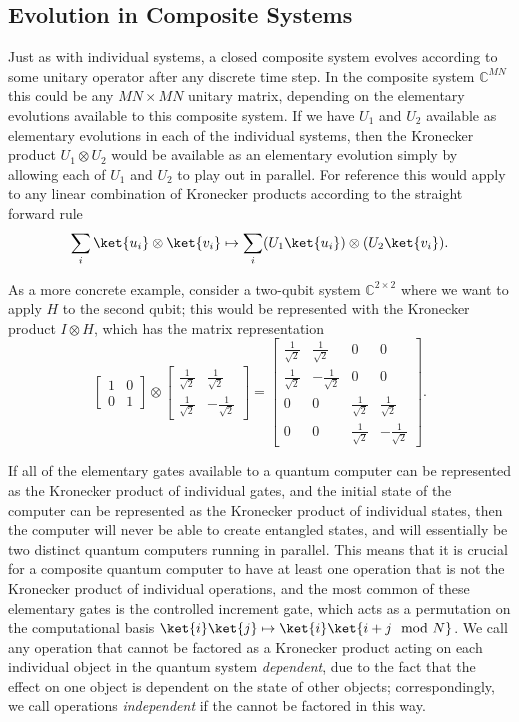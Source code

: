 \subsection{Evolution in Composite Systems}\label{composite-evolution}
Just as with individual systems, a closed composite system evolves according to some unitary operator after any discrete time step. In the composite system $\mathbb{C}^{MN}$ this could be any $MN \times MN$ unitary matrix, depending on the elementary evolutions available to this composite system. If we have $U_1$ and $U_2$ available as elementary evolutions in each of the individual systems, then the Kronecker product $U_1 \otimes U_2$ would be available as an elementary evolution simply by allowing each of $U_1$ and $U_2$ to play out in parallel. For reference this would apply to any linear combination of Kronecker products according to the straight forward rule
\[\sum_i \ket{u_i}\otimes\ket{v_i} \mapsto \sum_i (U_1\ket{u_i})\otimes (U_2\ket{v_i}).\]

As a more concrete example, consider a two-qubit system $\mathbb{C}^{2\times 2}$ where we want to apply $H$ to the second qubit; this would be represented with the Kronecker product $I \otimes H$, which has the matrix representation
\[
\left[\begin{matrix}
	1&0\\
	0&1
\end{matrix}\right]
\otimes
\left[\begin{matrix}
	\frac{1}{\sqrt{2}}&\frac{1}{\sqrt{2}}\\
	\frac{1}{\sqrt{2}}&-\frac{1}{\sqrt{2}}
\end{matrix}\right]
=
\left[\begin{matrix}
	\frac{1}{\sqrt{2}}&\frac{1}{\sqrt{2}}&0&0\\
	\frac{1}{\sqrt{2}}&-\frac{1}{\sqrt{2}}&0&0\\
	0&0&\frac{1}{\sqrt{2}}&\frac{1}{\sqrt{2}}\\
	0&0&\frac{1}{\sqrt{2}}&-\frac{1}{\sqrt{2}}
\end{matrix}\right].
\]

If all of the elementary gates available to a quantum computer can be represented as the Kronecker product of individual gates, and the initial state of the computer can be represented as the Kronecker product of individual states, then the computer will never be able to create entangled states, and will essentially be two distinct quantum computers running in parallel. This means that it is crucial for a composite quantum computer to have at least one operation that is not the Kronecker product of individual operations, and the most common of these elementary gates is the controlled increment gate, which acts as a permutation on the computational basis $\ket{i}\ket{j} \mapsto \ket{i}\ket{i+j \mod N}$. We call any operation that cannot be factored as a Kronecker product acting on each individual object in the quantum system \emph{dependent}, due to the fact that the effect on one object is dependent on the state of other objects; correspondingly, we call operations \emph{independent} if the cannot be factored in this way.

